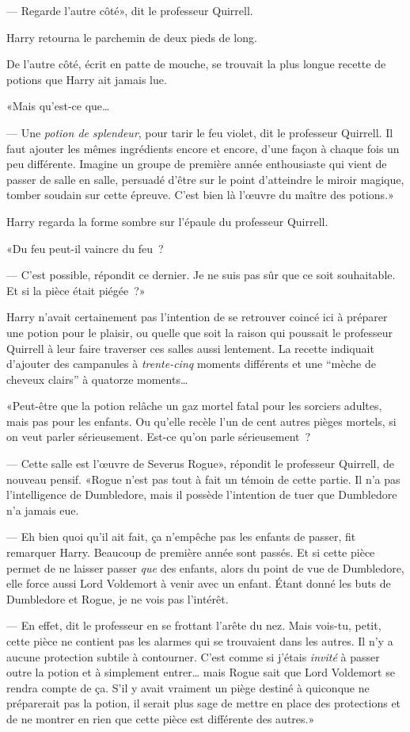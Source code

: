 --- Regarde l'autre côté», dit le professeur Quirrell.

Harry retourna le parchemin de deux pieds de long.

De l'autre côté, écrit en patte de mouche, se trouvait la plus longue recette de potions que Harry ait jamais lue.

«Mais qu'est-ce que…

--- Une \emph{potion de splendeur}, pour tarir le feu violet, dit le professeur Quirrell. Il faut ajouter les mêmes ingrédients encore et encore, d'une façon à chaque fois un peu différente. Imagine un groupe de première année enthousiaste qui vient de passer de salle en salle, persuadé d'être sur le point d'atteindre le miroir magique, tomber soudain sur cette épreuve. C'est bien là l'œuvre du maître des potions.»

Harry regarda la forme sombre sur l'épaule du professeur Quirrell.

«Du feu peut-il vaincre du feu~?

--- C'est possible, répondit ce dernier. Je ne suis pas sûr que ce soit souhaitable. Et si la pièce était piégée~?»

Harry n'avait certainement pas l'intention de se retrouver coincé ici à préparer une potion pour le plaisir, ou quelle que soit la raison qui poussait le professeur Quirrell à leur faire traverser ces salles aussi lentement. La recette indiquait d'ajouter des campanules à \emph{trente-cinq} moments différents et une “mèche de cheveux clairs” à quatorze moments…

«Peut-être que la potion relâche un gaz mortel fatal pour les sorciers adultes, mais pas pour les enfants. Ou qu'elle recèle l'un de cent autres pièges mortels, si on veut parler sérieusement. Est-ce qu'on parle sérieusement~?

--- Cette salle est l'œuvre de Severus Rogue», répondit le professeur Quirrell, de nouveau pensif. «Rogue n'est pas tout à fait un témoin de cette partie. Il n'a pas l'intelligence de Dumbledore, mais il possède l'intention de tuer que Dumbledore n'a jamais eue.

--- Eh bien quoi qu'il ait fait, ça n'empêche pas les enfants de passer, fit remarquer Harry. Beaucoup de première année sont passés. Et si cette pièce permet de ne laisser passer \emph{que} des enfants, alors du point de vue de Dumbledore, elle force aussi Lord Voldemort à venir avec un enfant. Étant donné les buts de Dumbledore et Rogue, je ne vois pas l'intérêt.

--- En effet, dit le professeur en se frottant l'arête du nez. Mais vois-tu, petit, cette pièce ne contient pas les alarmes qui se trouvaient dans les autres. Il n'y a aucune protection subtile à contourner. C'est comme si j'étais \emph{invité} à passer outre la potion et à simplement entrer… mais Rogue sait que Lord Voldemort se rendra compte de ça. S'il y avait vraiment un piège destiné à quiconque ne préparerait pas la potion, il serait plus sage de mettre en place des protections et de ne montrer en rien que cette pièce est différente des autres.»

